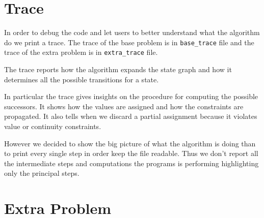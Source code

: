 \documentclass[a4paper]{article}
\begin{document}
\section{Trace}
In order to debug the code and let users to better understand what the algorithm do we print a trace. The trace of the base problem is in \texttt{base\_trace} file and the trace of the extra problem is in \texttt{extra\_trace} file.

The trace reports how the algorithm expands the state graph and how it determines all the possible transitions for a state.

In particular the trace gives insights on the procedure for computing the possible successors. It shows how the values are assigned and how the constraints are propagated. It also tells when we discard a partial assignment because it violates value or continuity constraints.   

However we decided to show the big picture of what the algorithm is doing than to print every single step in order keep the file readable. Thus we don't report all the intermediate steps and computations the programs is performing highlighting only the principal steps.

\section{Extra Problem}
\end{document}
